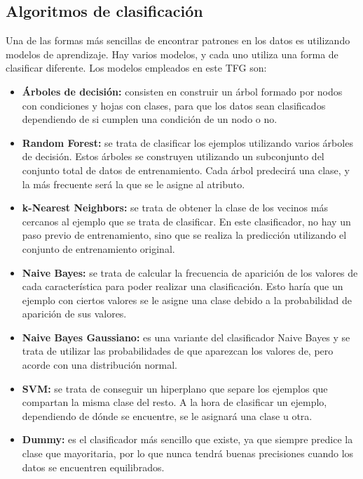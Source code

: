 \subsection{Algoritmos de clasificación}
Una de las formas más sencillas de encontrar patrones en los datos es utilizando modelos de aprendizaje. Hay varios modelos, y cada uno utiliza una forma de clasificar diferente. Los modelos empleados en este TFG son:
\begin{itemize}
	\item \textbf{Árboles de decisión:} consisten en construir un árbol formado por nodos con condiciones y hojas con clases, para que los datos sean clasificados dependiendo de si cumplen una condición de un nodo o no.~\cite{arbol_decision}
	\item \textbf{Random Forest:} se trata de clasificar los ejemplos utilizando varios árboles de decisión. Estos árboles se construyen utilizando un subconjunto del conjunto total de datos de entrenamiento. Cada árbol predecirá una clase, y la más frecuente será la que se le asigne al atributo.~\cite{random_forest}
	\item \textbf{k-Nearest Neighbors:} se trata de obtener la clase de los vecinos más cercanos al ejemplo que se trata de clasificar. En este clasificador, no hay un paso previo de entrenamiento, sino que se realiza la predicción utilizando el conjunto de entrenamiento original.~\cite{knn}
	\item \textbf{Naive Bayes:} se trata de calcular la frecuencia de aparición de los valores de cada característica para poder realizar una clasificación. Esto haría que un ejemplo con ciertos valores se le asigne una clase debido a la probabilidad de aparición de sus valores.~\cite{naive_bayes}
	\item \textbf{Naive Bayes Gaussiano:} es una variante del clasificador Naive Bayes y se trata de utilizar las probabilidades de que aparezcan los valores de, pero acorde con una distribución normal.~\cite{naive_bayes_g}
	\item \textbf{SVM:} se trata de conseguir un hiperplano que separe los ejemplos que compartan la misma clase del resto. A la hora de clasificar un ejemplo, dependiendo de dónde se encuentre, se le asignará una clase u otra.~\cite{svm}
	\item \textbf{Dummy:} es el clasificador más sencillo que existe, ya que siempre predice la clase que mayoritaria, por lo que nunca tendrá buenas precisiones cuando los datos se encuentren equilibrados.~\cite{dummy}
\end{itemize}

